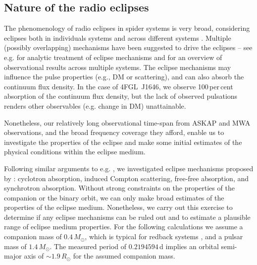 \documentclass[fleqn,usenatbib]{mnras}
\newcommand{\blinky}{{4FGL}~J1646}
\begin{document}
\subsection{Nature of the radio eclipses}
\label{subsec:eclipse}
The phenomenology of radio eclipses in spider systems is very broad, considering eclipses both in individuals systems and across different systems \citep{2019MNRAS.490..889P, 2020MNRAS.494.2948P}. Multiple (possibly overlapping) mechanisms have been suggested to drive the eclipses -- see e.g. \citet{1994ApJ...422..304T} for analytic treatment of eclipse mechanisms and \citet{2020MNRAS.494.2948P} for an overview of observational results across multiple systems. The eclipse  mechanisms may influence the pulse properties (e.g., DM or scattering), and can also absorb the continuum flux density. In the case of \blinky{}, we observe 100\,per\,cent absorption of the continuum flux density, but the lack of observed pulsations renders other observables (e.g. change in DM) unattainable.

Nonetheless, our relatively long observational time-span from ASKAP and MWA observations, and the broad frequency coverage they afford, enable us to investigate the properties of the eclipse and make some initial estimates of the physical conditions within the eclipse medium.

Following similar arguments to e.g. \citet{2021ApJ...920...58K}, we investigated eclipse mechanisms proposed by \citet{1994ApJ...422..304T}: cyclotron absorption, induced Compton scattering, free-free absorption, and synchrotron absorption. Without strong constraints on the properties of the companion or the binary orbit, we can only make broad estimates of the properties of the eclipse medium. Nonetheless, we carry out this exercise to determine if any eclipse mechanisms can be ruled out and to estimate a plausible range of eclipse medium properties. For the following calculations we assume a companion mass of $0.4\,M_\odot$, which is typical for redback systems \citep{2019ApJ...872...42S}, and a pulsar mass of $1.4\,M_\odot$. The measured period of $0.2194594\,$d implies an orbital semi-major axis of $\sim 1.9\,R_\odot$ for the assumed companion mass.
\end{document}
